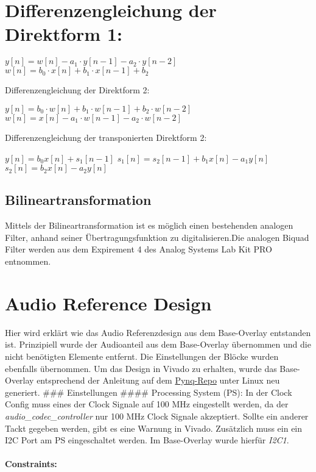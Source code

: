 \documentclass[
  ngerman,
  letterpaper,
  DIV=11]{scrreprt}
\begin{document}
\chapter{Differenzengleichung der Direktform
1:}\label{differenzengleichung-der-direktform-1}

\(y[n] = w[n] - a_1 \cdot y[n-1] - a_2 \cdot y[n-2]\)
\(w[n] = b_0 \cdot x[n] + b_1 \cdot x[n - 1] + b_2\)

Differenzengleichung der Direktform 2:

\(y[n] = b_0 \cdot w[n] + b_1 \cdot w[n-1] + b_2 \cdot w[n-2]\)
\(w[n] = x[n] - a_1 \cdot w[n-1] - a_2 \cdot w[n-2]\)

Differenzengleichung der transponierten Direktform 2:

\(y[n] = b_0 x[n] + s_1[n-1]\)
\(s_1[n] = s_2[n - 1] + b_1 x[n] - a_1 y[n]\)
\(s_2[n] = b_2 x[n] - a_2 y[n]\)

\section{Bilineartransformation}\label{bilineartransformation}

Mittels der Bilineartransformation ist es möglich einen bestehenden
analogen Filter, anhand seiner Übertragungsfunktion zu
digitalisieren.Die analogen Biquad Filter werden aus dem Expirement 4
des Analog Systems Lab Kit PRO entnommen.

\chapter{Audio Reference Design}\label{audio-reference-design}

Hier wird erklärt wie das Audio Referenzdesign aus dem Base-Overlay
entstanden ist. Prinzipiell wurde der Audioanteil aus dem Base-Overlay
übernommen und die nicht benötigten Elemente entfernt. Die Einstellungen
der Blöcke wurden ebenfalls übernommen. Um das Design in Vivado zu
erhalten, wurde das Base-Overlay entsprechend der Anleitung auf dem
\href{https://github.com/Xilinx/PYNQ/tree/master}{Pynq-Repo} unter Linux
neu generiert. \#\#\# Einstellungen \#\#\#\# Processing System (PS): In
der Clock Config muss eines der Clock Signale auf 100 MHz eingestellt
werden, da der \emph{audio\_codec\_controller} nur 100 MHz Clock Signale
akzeptiert. Sollte ein anderer Tackt gegeben werden, gibt es eine
Warnung in Vivado. Zusätzlich muss ein ein I2C Port am PS eingeschaltet
werden. Im Base-Overlay wurde hierfür \emph{I2C1}.

\subsubsection{Constraints:}\label{constraints}
\end{document}
